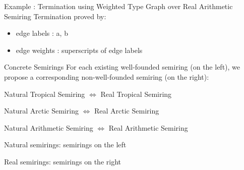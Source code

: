 \documentclass{beamer}
\newcommand{\graphbox}[8]{
  \begin{scope}[xshift=#2,yshift=#3]
    \draw [rounded corners=2mm] (0,0) rectangle (#4,-#5);
    \node at (0,0mm) [anchor=north west,inner sep=1mm] {#1};
    \begin{scope}[xshift=#4/2+#6,yshift=#7] 
    #8
    \end{scope}
  \end{scope}
}
\begin{document}
\begin{frame}{Example : Termination using Weighted Type Graph over Real Arithmetic Semiring}
  Termination proved by:
    \begin{center}
    \end{center}
    \begin{itemize}
      \item edge labels : a, b
      \item edge weights : superscripts of edge labels
    \end{itemize}
  

\end{frame}

\begin{frame}{Concrete Semirings}
  For each existing well-founded semiring (on the left), we propose a corresponding non-well-founded semiring (on the right):

  \begin{center}
     Natural Tropical Semiring $\Leftrightarrow$ Real Tropical Semiring
  \end{center}
  \begin{center}
     Natural Arctic Semiring $\Leftrightarrow$ Real Arctic Semiring
  \end{center}
  \begin{center}
    Natural Arithmetic Semiring $\Leftrightarrow$ Real Arithmetic Semiring
  \end{center}

  Natural semirings: semirings on the left

  Real semirings: semirings on the right
\end{frame}
\end{document}

